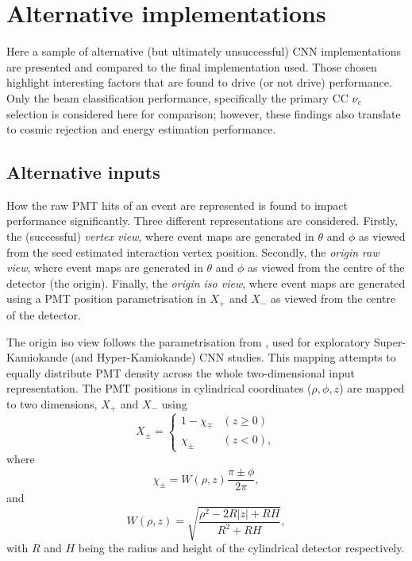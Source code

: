 \section{Alternative implementations} %
\label{sec:results_alt} %

Here a sample of alternative (but ultimately unsuccessful) \chips CNN implementations are
presented and compared to the final implementation used. Those chosen highlight interesting
factors that are found to drive (or not drive) performance. Only the beam classification
performance, specifically the primary CC $\nu_{e}$ selection is considered here for comparison;
however, these findings also translate to cosmic rejection and energy estimation performance.

\subsection{Alternative inputs} %
\label{sec:results_alt_inputs} %

How the raw PMT hits of an event are represented is found to impact performance significantly.
Three different representations are considered. Firstly, the (successful) \emph{vertex view},
where event maps are generated in $\theta$ and $\phi$ as viewed from the seed estimated
interaction vertex position. Secondly, the \emph{origin raw view}, where event maps are generated
in $\theta$ and $\phi$ as viewed from the centre of the detector (the origin). Finally, the
\emph{origin iso view}, where event maps are generated using a PMT position parametrisation in
$X_{+}$ and $X_{-}$ as viewed from the centre of the detector.

The origin iso view follows the parametrisation from , used for
exploratory Super-Kamiokande (and Hyper-Kamiokande) CNN studies. This mapping attempts to equally
distribute PMT density across the whole two-dimensional input representation. The PMT positions in
cylindrical coordinates ($\rho,\phi,z$) are mapped to two dimensions, $X_{+}$ and $X_{-}$ using
\begin{equation} %
    X_{\pm}=
    \begin{cases}
        1-\chi_{\mp} & (z \geq 0) \\
        \chi_{\pm}   & (z < 0),
    \end{cases}
    \label{eq:iso_case}
\end{equation}
where
\begin{equation} %
    \chi_{\pm}=W(\rho,z)\frac{\pi\pm\phi}{2\pi},
    \label{eq:iso_main}
\end{equation}
and
\begin{equation} %
    W(\rho,z)=\sqrt{\frac{\rho^{2}-2R|z|+RH}{R^{2}+RH}},
    \label{eq:iso_part}
\end{equation}
with $R$ and $H$ being the radius and height of the cylindrical detector respectively.

